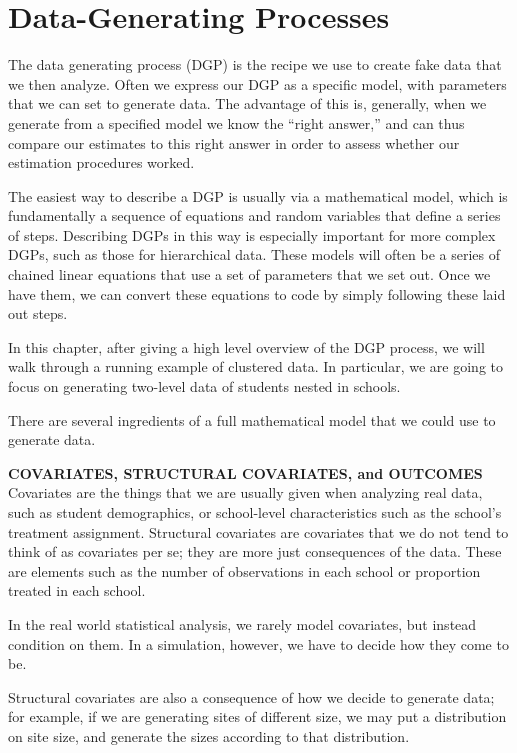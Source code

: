 \documentclass[
]{book}
\begin{document}
\chapter{Data-Generating Processes}\label{data-generating-processes}

The data generating process (DGP) is the recipe we use to create fake data that we then analyze.
Often we express our DGP as a specific model, with parameters that we can set to generate data.
The advantage of this is, generally, when we generate from a specified model we know the ``right answer,'' and can thus compare our estimates to this right answer in order to assess whether our estimation procedures worked.

The easiest way to describe a DGP is usually via a mathematical model, which is fundamentally a sequence of equations and random variables that define a series of steps.
Describing DGPs in this way is especially important for more complex DGPs, such as those for hierarchical data.
These models will often be a series of chained linear equations that use a set of parameters that we set out.
Once we have them, we can convert these equations to code by simply following these laid out steps.

In this chapter, after giving a high level overview of the DGP process, we will walk through a running example of clustered data.
In particular, we are going to focus on generating two-level data of students nested in schools.

There are several ingredients of a full mathematical model that we could use to generate data.

\textbf{COVARIATES, STRUCTURAL COVARIATES, and OUTCOMES}
Covariates are the things that we are usually given when analyzing real data, such as student demographics, or school-level characteristics such as the school's treatment assignment.
Structural covariates are covariates that we do not tend to think of as covariates per se; they are more just consequences of the data.
These are elements such as the number of observations in each school or proportion treated in each school.

In the real world statistical analysis, we rarely model covariates, but instead condition on them.
In a simulation, however, we have to decide how they come to be.

Structural covariates are also a consequence of how we decide to generate data; for example, if we are generating sites of different size, we may put a distribution on site size, and generate the sizes according to that distribution.
\end{document}
